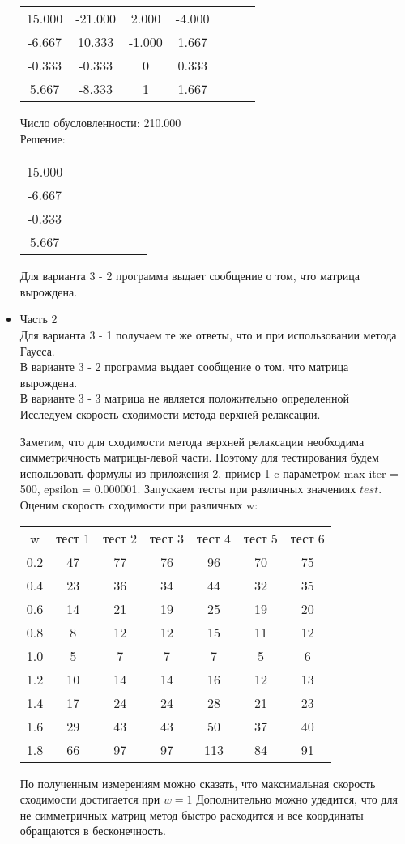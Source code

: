 \documentclass[a4paper,12pt,titlepage,finall]{article}
\begin{document}
\begin{itemize}
\begin{tabular}{ccccccc}
15.000 & -21.000 & 2.000 & -4.000\\
-6.667 & 10.333 & -1.000 & 1.667\\
-0.333 & -0.333 & 0 & 0.333\\
5.667 & -8.333  & 1 & 1.667\\
\end{tabular}

Число обусловленности: 210.000\\
Решение: 
\begin{tabular}{ccccccc}
15.000 \\
-6.667 \\
-0.333 \\
5.667 \\
\end{tabular}

Для варианта 3 - 2 программа выдает сообщение о том, что матрица вырождена.


\item Часть 2\\

Для варианта 3 - 1 получаем те же ответы, что и при использовании метода Гаусса.\\
В варианте 3 - 2 программа выдает сообщение о том, что матрица вырождена.\\
В варианте 3 - 3 матрица не является положительно определенной\\

Исследуем скорость сходимости метода верхней релаксации.

Заметим, что для сходимости метода верхней релаксации необходима симметричность матрицы-левой части. Поэтому для тестирования будем использовать формулы из приложения 2, пример 1 c параметром max-iter = 500, epsilon = 0.000001. Запускаем тесты при различных значениях $test$.
Оценим скорость сходимости при различных w:
\begin{center}
\begin{tabular}{ccccccc}
w & тест 1 & тест 2 & тест 3 & тест 4 & тест 5 & тест 6\\
0.2 & 47 & 77 & 76 & 96 & 70 & 75\\
0.4 & 23 & 36 & 34 & 44 & 32 & 35\\
0.6 & 14 & 21 & 19 & 25 & 19 & 20\\
0.8 & 8  & 12 & 12  & 15 & 11 & 12\\
1.0 & 5  & 7   & 7   &  7  & 5 & 6\\
1.2 & 10 & 14 & 14 & 16 & 12 & 13\\
1.4 & 17 & 24 & 24 & 28 & 21 & 23\\
1.6 & 29 & 43 & 43 & 50 & 37 & 40\\
1.8 & 66 & 97 & 97 & 113 & 84 & 91\\
\end{tabular}
\end{center}
По полученным измерениям можно  сказать, что максимальная скорость сходимости достигается при $w = 1$
Дополнительно можно удедится, что для не симметричных матриц метод быстро расходится и все координаты обращаются в бесконечность.

\end{itemize}
\end{document}
